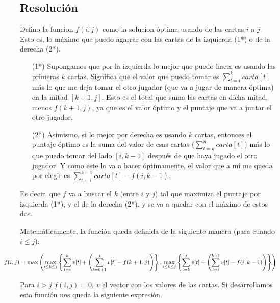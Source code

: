 \subsection{Resoluci\'on}

Defino la funcion $f(i,j)$ como la solucion \'optima usando de las cartas $i$ a $j$. Esto es, lo m\'aximo que puedo agarrar con las cartas de la izquierda (1*) o de la derecha (2*). 

\begin{enumerate}
\item[(1*)] \label{x_izq} Supongamos que por la izquierda lo mejor que puedo hacer es usando las primeras $k$ cartas. Significa que el valor que puedo tomar es $\sum_{t=i}^{k} carta[t]$ m\'as lo que me deja tomar el otro jugador (que va a jugar de manera \'optima) en la mitad $[k+1, j]$. Esto es el total que suma las cartas en dicha mitad, menos $f(k+1, j)$, ya que es el valor \'optimo y el puntaje que va a juntar el otro jugador. 

\item[(2*)] \label{x_der} Asimismo, si lo mejor por derecha es usando $k$ cartas, entonces el puntaje \'optimo es la suma del valor de esas cartas ($\sum_{t=k}^{n} carta[t]$) m\'as lo que puedo tomar del lado $[i, k-1]$ despu\'es de que haya jugado el otro jugador. Y como este lo va a hacer \'optimamente, el valor que a m\'i me queda por elegir es $\sum_{t=i}^{k-1} carta[t] - f(i,k-1)$. 
\end{enumerate}

Es decir, que $f$ va a buscar el $k$ (entre $i$ y $j$) tal que maximiza el puntaje por izquierda (1*), y el de la derecha (2*), y se va a quedar con el m\'aximo de estos dos.

Matem\'aticamente, la funci\'on queda definida de la siguiente manera (para cuando $i \leq j$): 

$$\hspace*{-1cm} f(i,j) = \max\left( 
      \max_{i \leq k \leq j}\left\{ \sum_{t=i}^k v[t] + \left( \sum_{t=k+1}^{j} v[t] - f(k+1,j) \right) \right\},  
      \max_{i \leq k \leq j}\left\{ \sum_{t=k}^j v[t] + \left( \sum_{t=i}^{k-1} v[t] - f(i,k-1) \right) \right\} 
    \right) $$

Para $i > j$ $f(i,j) = 0$.
$v$ el vector con los valores de las cartas.
Si desarrollamos esta funci\'on nos queda la siguiente expresi\'on. 


